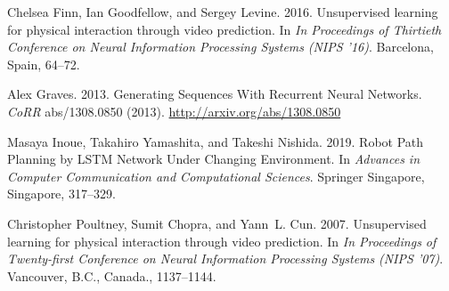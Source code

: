 \documentclass[sigconf]{acmart}
\begin{document}
\ifx \showCODEN    \undefined {}     \fi
\ifx \showDOI      \undefined \def \showDOI       #1{#1}\fi
\ifx \showISBNx    \undefined \def \showISBNx     #1{\unskip}     \fi
\ifx \showISBNxiii \undefined \def \showISBNxiii  #1{\unskip}     \fi
\ifx \showISSN     \undefined \def \showISSN      #1{\unskip}     \fi
\ifx \showLCCN     \undefined \def \showLCCN      #1{\unskip}     \fi
\ifx \shownote     \undefined \def \shownote      #1{#1}          \fi
\ifx \showarticletitle \undefined \def \showarticletitle #1{#1}   \fi
\ifx \showURL      \undefined \def \showURL{\relax}        \fi
\providecommand\bibfield[2]{#2}
\providecommand\bibinfo[2]{#2}
\providecommand\natexlab[1]{#1}
\providecommand\showeprint[2][]{arXiv:#2}

\bibfield{author}{\bibinfo{person}{Chelsea Finn}, \bibinfo{person}{Ian
  Goodfellow}, {and} \bibinfo{person}{Sergey Levine}.}
  \bibinfo{year}{2016}\natexlab{}.
\newblock \showarticletitle{Unsupervised learning for physical interaction
  through video prediction}. In \bibinfo{booktitle}{\emph{In Proceedings of
  Thirtieth Conference on Neural Information Processing Systems}}
  \emph{(\bibinfo{series}{NIPS '16})}. \bibinfo{address}{Barcelona, Spain},
  \bibinfo{pages}{64--72}.
\newblock


\bibfield{author}{\bibinfo{person}{Alex Graves}.}
  \bibinfo{year}{2013}\natexlab{}.
\newblock \showarticletitle{Generating Sequences With Recurrent Neural
  Networks}.
\newblock \bibinfo{journal}{\emph{CoRR}}  \bibinfo{volume}{abs/1308.0850}
  (\bibinfo{year}{2013}).
\newblock
\urldef\tempurl%
\url{http://arxiv.org/abs/1308.0850}
\showURL{%
\tempurl}


\bibfield{author}{\bibinfo{person}{Masaya Inoue}, \bibinfo{person}{Takahiro
  Yamashita}, {and} \bibinfo{person}{Takeshi Nishida}.}
  \bibinfo{year}{2019}\natexlab{}.
\newblock \showarticletitle{Robot Path Planning by LSTM Network Under Changing
  Environment}. In \bibinfo{booktitle}{\emph{Advances in Computer Communication
  and Computational Sciences}}. \bibinfo{publisher}{Springer Singapore},
  \bibinfo{address}{Singapore}, \bibinfo{pages}{317--329}.
\newblock


\bibfield{author}{\bibinfo{person}{Christopher Poultney},
  \bibinfo{person}{Sumit Chopra}, {and} \bibinfo{person}{Yann~L. Cun}.}
  \bibinfo{year}{2007}\natexlab{}.
\newblock \showarticletitle{Unsupervised learning for physical interaction
  through video prediction}. In \bibinfo{booktitle}{\emph{In Proceedings of
  Twenty-first Conference on Neural Information Processing Systems}}
  \emph{(\bibinfo{series}{NIPS '07})}. \bibinfo{address}{Vancouver, B.C.,
  Canada.}, \bibinfo{pages}{1137--1144}.
\newblock
\end{document}
